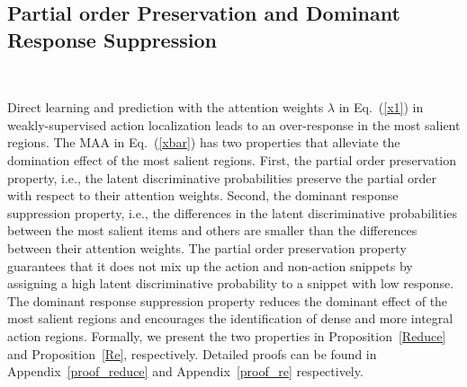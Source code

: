\documentclass{article} \usepackage{iclr2019_conference,times}
\begin{document}
\subsection{Partial order Preservation and Dominant Response Suppression}~\label{TwoPoposition}

Direct learning and prediction with the attention weights $\lambda$ in Eq.~(\ref{x1}) in weakly-supervised action localization leads to an over-response in the most salient regions.
The MAA in Eq.~(\ref{xbar}) has two properties that alleviate the domination effect of the most salient regions. First, the partial order preservation property, i.e., the latent discriminative probabilities preserve the partial order with respect to their attention weights. Second, the dominant response suppression property, i.e., the differences in the latent discriminative probabilities between the most salient items and others are smaller than the differences between their attention weights. The partial order preservation property guarantees that it does not mix up the action and non-action snippets by assigning a high latent discriminative probability to a snippet with low response. The dominant response suppression property reduces the dominant effect of the most salient regions and encourages the identification of dense and more integral action regions. Formally, we present the two properties in Proposition~\ref{Reduce} and Proposition~\ref{Re}, respectively. Detailed proofs can be found in Appendix~\ref{proof_reduce} and Appendix~\ref{proof_re} respectively. 
\end{document}
